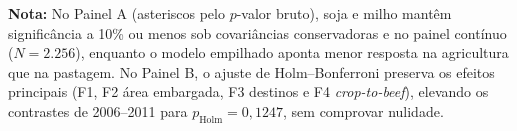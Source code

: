 \begin{table}[htbp]
\begin{minipage}{\textwidth}
\noindent\textbf{Nota:} No Painel A (asteriscos pelo $p$-valor bruto), soja e milho mantêm significância a 10\% ou menos sob covariâncias conservadoras e no painel contínuo ($N = 2.256$), enquanto o modelo empilhado aponta menor resposta na agricultura que na pastagem. No Painel B, o ajuste de Holm--Bonferroni preserva os efeitos principais (F1, F2 área embargada, F3 destinos e F4 \textit{crop-to-beef}), elevando os contrastes de 2006--2011 para $p_{\text{Holm}} = 0{,}1247$, sem comprovar nulidade.
\end{minipage}
\end{table}
